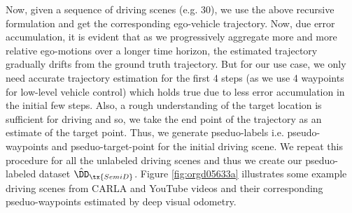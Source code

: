\documentclass[letterpaper, 12pt]{book}
\theoremstyle{definition}
\theoremstyle{definition}
\theoremstyle{definition}
\theoremstyle{definition}
\theoremstyle{definition}
\begin{document}
Now, given a sequence of driving scenes (e.g. 30), we use the above recursive
formulation and get the corresponding ego-vehicle trajectory. Now, due error
accumulation, it is evident that as we progressively aggregate more and more
relative ego-motions over a longer time horizon, the estimated trajectory
gradually drifts from the ground truth trajectory. But for our use case, we only
need accurate trajectory estimation for the first 4 steps (as we use 4 waypoints
for low-level vehicle control) which holds true due to less error accumulation
in the initial few steps. Also, a rough understanding of the target location is
sufficient for driving and so, we take the end point of the trajectory as an
estimate of the target point. Thus, we generate pseduo-labels
i.e. pseudo-waypoints and pseduo-target-point for the initial driving scene. We
repeat this procedure for all the unlabeled driving scenes and thus we create
our pseduo-labeled dataset \(\hat{\DD}_{\tx{SemiD}}\). Figure \ref{fig:orgd05633a}
illustrates some example driving scenes from CARLA and YouTube videos and their
corresponding pseduo-waypoints estimated by deep visual odometry.
\end{document}
